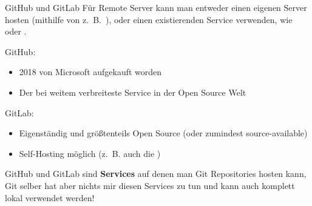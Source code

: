 \documentclass{setbeamer}
\begin{document}
\begin{frame}{GitHub und GitLab}
    Für Remote Server kann man entweder einen eigenen Server hosten (mithilfe von z.~B.~), oder einen existierenden Service verwenden, wie  oder .

    \vspace{3mm}

    GitHub:
    \begin{itemize}
        \item 2018 von Microsoft aufgekauft worden
        \item Der bei weitem verbreiteste Service in der Open Source Welt
    \end{itemize}

    \vspace{3mm}

    GitLab:
    \begin{itemize}
        \item Eigenständig und größtenteils Open Source (oder zumindest source-available)
        \item Self-Hosting möglich (z.~B. auch die )
    \end{itemize}

    \vspace{3mm}

    \begin{TUMBoxFill}[orange]{}{}
        GitHub und GitLab sind \textbf{Services} auf denen man Git Repositories hosten kann, Git selber hat aber nichts mir diesen Services zu tun und kann auch komplett lokal verwendet werden!
    \end{TUMBoxFill}
\end{frame}
\end{document}
